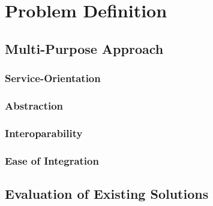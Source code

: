 \chapter{Problem Definition}


\section{Multi-Purpose Approach}

\subsection{Service-Orientation}

\subsection{Abstraction}

\subsection{Interoparability}

\subsection{Ease of Integration}



\section{Evaluation of Existing Solutions}